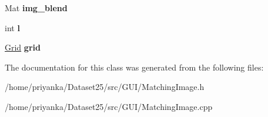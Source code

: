 \begin{DoxyCompactItemize}
\item 
\hypertarget{classMatchingImage_a38bb58de209f335d9d6129a24ac8235e}{\-Mat {\bfseries img\-\_\-blend}}\label{classMatchingImage_a38bb58de209f335d9d6129a24ac8235e}

\item 
\hypertarget{classMatchingImage_a9e179c9055536cb7f37c99ce48a65a44}{int {\bfseries l}}\label{classMatchingImage_a9e179c9055536cb7f37c99ce48a65a44}

\item 
\hypertarget{classMatchingImage_aaf52c9c5343328007df832e716938c9f}{\hyperlink{classGrid}{\-Grid} {\bfseries grid}}\label{classMatchingImage_aaf52c9c5343328007df832e716938c9f}

\end{DoxyCompactItemize}


\-The documentation for this class was generated from the following files\-:\begin{DoxyCompactItemize}
\item 
/home/priyanka/\-Dataset25/src/\-G\-U\-I/\-Matching\-Image.\-h\item 
/home/priyanka/\-Dataset25/src/\-G\-U\-I/\-Matching\-Image.\-cpp\end{DoxyCompactItemize}
